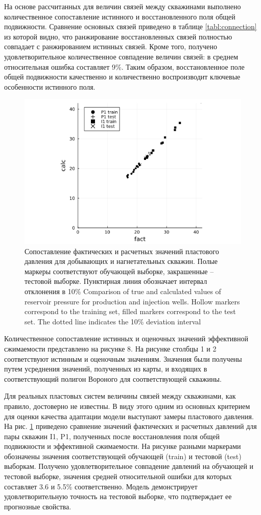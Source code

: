 \documentclass{article}
\begin{document}
 На основе рассчитанных для величин связей между скважинами выполнено количественное сопоставление истинного и восстановленного поля общей подвижности. Сравнение основных связей приведено в таблице \ref{tabl:connection} из которой видно, что ранжирование восстановленных связей полностью совпадает с ранжированием истинных связей. Кроме того, получено удовлетворительное количественное совпадение величин связей: в среднем относительная ошибка составляет 9\%. Таким образом, восстановленное поле общей подвижности качественно и количественно воспроизводит ключевые особенности истинного поля.

\begin{figure}
	\centering
	\includegraphics[width=0.7\linewidth]{fig6}
	\caption{Сопоставление фактических и расчетных значений пластового давления для добывающих и нагнетательных скважин. Полые маркеры соответствуют обучающей выборке, закрашенные – тестовой выборке. Пунктирная линия обозначает интервал отклонения в 10\% Comparison of true and calculated values of reservoir pressure for production and injection wells. Hollow markers correspond to the training set, filled markers correspond to the test set. The dotted line indicates the 10\% deviation interval}
	\label{fig:cp}
\end{figure}


Количественное сопоставление истинных и оценочных значений эффективной сжимаемости представлено на рисунке 8. На рисунке столбцы 1 и 2 соответствуют истинным и оценочным значениям. Значения были получены путем усреднения значений, полученных из карты, и входящих в соответствующий полигон Вороного для соответствующей скважины. 


Для реальных пластовых систем величины связей между скважинами, как правило, достоверно не известны. В виду этого одним из основных критерием для оценки качества адаптации модели выступают замеры пластового давления. На рис. \ref{fig:cp} приведено сравнение значений фактических и расчетных давлений для пары скважин I1, P1, полученных после восстановления поля общей подвижности и эффективной сжимаемости. На рисунке разными маркерами обозначены значения соответствующей обучающей (train) и тестовой (test) выборкам. Получено удовлетворительное совпадение давлений на обучающей и тестовой выборке, значения средней относительной ошибки для которых составляет 3.6 и 5.5\% соответственно. Модель демонстрирует удовлетворительную точность на тестовой выборке, что подтверждает ее прогнозные свойства.
\end{document}
